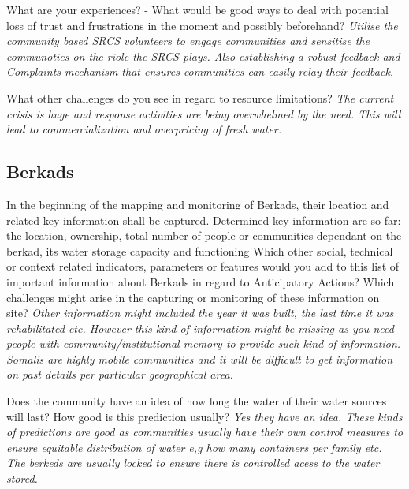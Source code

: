 What are your experiences? - What would be good ways to deal with potential loss of trust and frustrations in the moment and possibly beforehand?  \newline
\textit{Utilise the community based SRCS volunteers to engage communities and sensitise the communoties on the riole the SRCS plays. Also establishing a robust feedback and Complaints mechanism that ensures communities can easily relay their feedback.}

What other challenges do you see in regard to resource limitations?  \newline
\textit{The current crisis is huge and response activities are being overwhelmed by the need. This will lead to commercialization and overpricing of fresh water.}

\subsection*{Berkads}

In the beginning of the mapping and monitoring of Berkads, their location and related key information shall be captured. Determined key information are so far:
the location,\newline
ownership,\newline
total number of people or communities dependant on the berkad,\newline
its water storage capacity and\newline
functioning\newline
Which other social, technical or context related indicators, parameters or features would you add to this list of important information about Berkads in regard to Anticipatory Actions? Which challenges might arise in the capturing or monitoring of these information on site?\newline  
\textit{Other information might included the year it was built, the last time it was rehabilitated etc. However this kind of information might be missing as you need people with community/institutional memory to provide such kind of information. Somalis are highly mobile communities and it will be difficult to get information on past details per particular geographical area.}

Does the community have an idea of how long the water of their water sources will last? How good is this prediction usually?
\textit{Yes they have an idea. These kinds of predictions are good as communities usually have their own control measures to ensure equitable distribution of water e,g how many containers per family etc. The berkeds are usually locked to ensure there is controlled acess to the water stored.}

